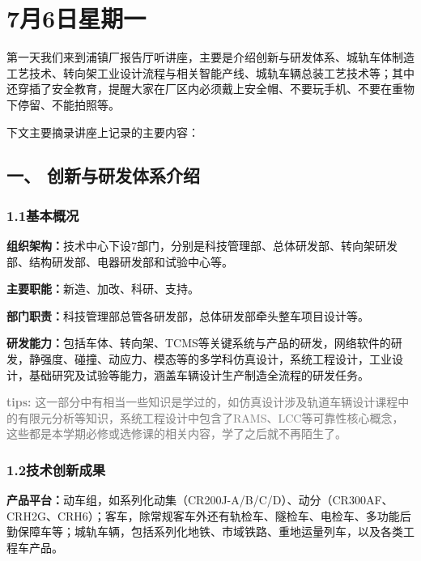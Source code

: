 \documentclass[12pt, oneside, a4paper]{ctexart}
\newcommand{\diaryJournalBodyFont}{\diarySong\fontsize{12pt}{15pt}\selectfont}
\begin{document}
\section*{7月6日\quad{}星期一}
\diaryJournalBodyFont\vspace{-3mm}\par{}
第一天我们来到浦镇厂报告厅听讲座，主要是介绍创新与研发体系、城轨车体制造工艺技术、转向架工业设计流程与相关智能产线、城轨车辆总装工艺技术等；其中还穿插了安全教育，提醒大家在厂区内必须戴上安全帽、不要玩手机、不要在重物下停留、不能拍照等。\par{}
下文主要摘录讲座上记录的主要内容：\par{}
\vspace{-5mm}\subsection*{一、 创新与研发体系介绍}
\vspace{-2mm}\subsubsection*{1.1\quad{}基本概况}\vspace{-2mm}
{\bf{}组织架构：}技术中心下设7部门，分别是科技管理部、总体研发部、转向架研发部、结构研发部、电器研发部和试验中心等。\par{}
{\bf{}主要职能：}新造、加改、科研、支持。\par{}
{\bf{}部门职责：}科技管理部总管各研发部，总体研发部牵头整车项目设计等。\par{}
{\bf{}研发能力：}包括车体、转向架、TCMS等关键系统与产品的研发，网络软件的研发，静强度、碰撞、动应力、模态等的多学科仿真设计，系统工程设计，工业设计，基础研究及试验等能力，涵盖车辆设计生产制造全流程的研发任务。\par{}
\textcolor{gray}{{\bf{}tips: }这一部分中有相当一些知识是学过的，如仿真设计涉及轨道车辆设计课程中的有限元分析等知识，系统工程设计中包含了RAMS、LCC等可靠性核心概念，这些都是本学期必修或选修课的相关内容，学了之后就不再陌生了。}\par{}
\vspace{-5mm}\subsubsection*{1.2\quad{}技术创新成果}\vspace{-2mm}
{\bf{}产品平台：}动车组，如系列化动集（CR200J-A/B/C/D）、动分（CR300AF、CRH2G、CRH6）；客车，除常规客车外还有轨检车、隧检车、电检车、多功能后勤保障车等；城轨车辆，包括系列化地铁、市域铁路、重地运量列车，以及各类工程车产品。\par{}
\end{document}
